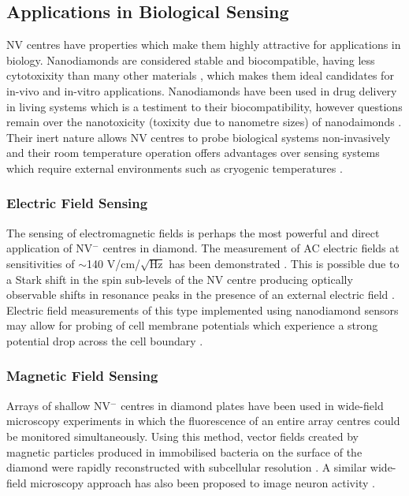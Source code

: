 \documentclass[10pt]{article}
\begin{document}
\begin{multicols}{2}
\subsection{Applications in Biological Sensing}
NV centres have properties which make them highly attractive for applications in biology. Nanodiamonds are considered stable and biocompatible, having less cytotoxixity than many other materials \cite{vaijayanthimala2012long,schrand2007differential}, which makes them ideal candidates for in-vivo and in-vitro applications. Nanodiamonds have been used in drug delivery in living systems \cite{huang2007active} which is a testiment to their biocompatibility, however questions remain over the nanotoxicity (toxixity due to nanometre sizes) of nanodaimonds \cite{schrand2007differential}. Their inert nature allows NV centres to probe biological systems non-invasively and their room temperature operation offers advantages over sensing systems which require external environments such as cryogenic temperatures \cite{wu2016diamond}. 

\subsubsection{Electric Field Sensing}
The sensing of electromagnetic fields is perhaps the most powerful and direct application of NV$^-$ centres in diamond. The measurement of AC electric fields at sensitivities of $\sim$140 V/cm/$\sqrt{\textrm{Hz}}$ has been demonstrated \cite{dolde2011electric}. This is possible due to a Stark shift in the spin sub-levels of the NV centre producing optically observable shifts in resonance peaks in the presence of an external electric field \cite{dolde2011electric}. Electric field measurements of this type implemented using nanodiamond sensors may allow for probing of cell membrane potentials which experience a strong potential drop across the cell boundary \cite{schirhagl2014nitrogen}. 


\subsubsection{Magnetic Field Sensing}

Arrays of shallow NV$^-$ centres in diamond plates have been used in wide-field microscopy experiments in which the fluorescence of an entire array centres could be monitored simultaneously. Using this method, vector fields created by magnetic particles produced in immobilised bacteria on the surface of the diamond were rapidly reconstructed with subcellular resolution \cite{le2013optical}. A similar wide-field microscopy approach has also been proposed to image neuron  activity \cite{hall2012high}. 



\end{multicols}
\end{document}
